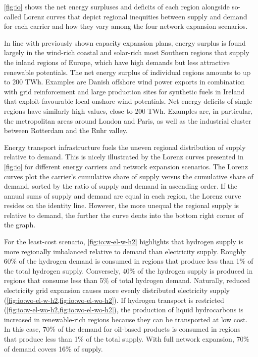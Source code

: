 \cref{fig:io} shows the net energy surpluses and deficits of each region
alongside so-called Lorenz curves that depict regional inequities between supply
and demand for each carrier and how they vary among the four network expansion
scenarios.

In line with previously shown capacity expansion plans, energy surplus is found
largely in the wind-rich coastal and solar-rich most Southern regions that
supply the inland regions of Europe, which have high demands but less attractive
renewable potentials. The net energy surplus of individual regions amounts to up
to 200 TWh. Examples are Danish offshore wind power exports in combination with
grid reinforcement and large production sites for synthetic fuels in Ireland
that exploit favourable local onshore wind potentials. Net energy deficits of
single regions have similarly high values, close to 200 TWh. Examples are, in
particular, the metropolitan areas around London and Paris, as well as the
industrial cluster between Rotterdam and the Ruhr valley.

Energy transport infrastructure fuels the uneven regional distribution of supply
relative to demand. This is nicely illustrated by the Lorenz curves presented in
\cref{fig:io} for different energy carriers and network expansion scenarios. The
Lorenz curves plot the carrier's cumulative share of supply versus the
cumulative share of demand, sorted by the ratio of supply and demand in
ascending order. If the annual sums of supply and demand are equal in each
region, the Lorenz curve resides on the identity line. However, the more unequal
the regional supply is relative to demand, the further the curve dents into the
bottom right corner of the graph.

For the least-cost scenario, \cref{fig:io:w-el-w-h2} highlights that hydrogen
supply is more regionally imbalanced relative to demand than electricity supply.
Roughly 60\% of the hydrogen demand is consumed in regions that produce less
than 1\% of the total hydrogen supply. Conversely, 40\% of the hydrogen supply
is produced in regions that consume less than 5\% of total hydrogen demand.
Naturally, reduced electricity grid expansion causes more evenly distributed
electricity supply (\cref{fig:io:wo-el-w-h2,fig:io:wo-el-wo-h2}). If hydrogen
transport is restricted (\cref{fig:io:w-el-wo-h2,fig:io:wo-el-wo-h2}), the
production of liquid hydrocarbons is increased in renewable-rich regions because
they can be transported at low cost. In this case, 70\% of the demand for
oil-based products is consumed in regions that produce less than 1\% of the
total supply. With full network expansion, 70\% of demand covers 16\% of supply.

